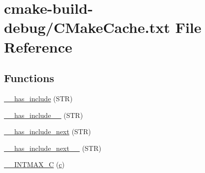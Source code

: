 \hypertarget{CMakeCache_8txt}{}\section{cmake-\/build-\/debug/\+C\+Make\+Cache.txt File Reference}
\label{CMakeCache_8txt}
\subsection*{Functions}
\begin{DoxyCompactItemize}
\item 
\hyperlink{CMakeCache_8txt_a15033d43fd4881ecb41d0a9ef3f98c8b}{\+\_\+\+\_\+has\+\_\+include} (S\+TR)
\item 
\hyperlink{CMakeCache_8txt_a97e2b5b7d48e0c704f01b437bbb41bc3}{\+\_\+\+\_\+has\+\_\+include\+\_\+\+\_\+} (S\+TR)
\item 
\hyperlink{CMakeCache_8txt_a6bc72b80bcdbfe30be5d38536affde6f}{\+\_\+\+\_\+has\+\_\+include\+\_\+next} (S\+TR)
\item 
\hyperlink{CMakeCache_8txt_ac96b06945e62d6ea6764b6d86745ec26}{\+\_\+\+\_\+has\+\_\+include\+\_\+next\+\_\+\+\_\+} (S\+TR)
\item 
\hyperlink{CMakeCache_8txt_a2f10a19f2682f0eb61615edae3fa69ef}{\+\_\+\+\_\+\+I\+N\+T\+M\+A\+X\+\_\+C} (\hyperlink{CMakeCache_8txt_aac1d6a1710812201527c735f7c6afbaa}{c})
\end{DoxyCompactItemize}
